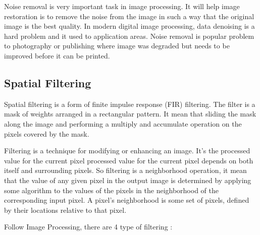 \documentclass[10pt]{article}
\begin{document}
Noise removal is very important task in image processing. It will help image restoration is to remove the noise from the image in such a way that the original image is the best quality. In modern digital image processing, data denoising is a hard problem and it used to application areas. Noise removal is popular problem to  photography or publishing where image was degraded but needs to be improved before it can be printed.


\subsection{Spatial Filtering}
Spatial filtering is a form of finite impulse response (FIR) filtering. The filter is a mask of weights arranged in a rectangular pattern. It mean that sliding the mask along the image and performing a multiply and accumulate operation on the pixels covered by the mask.


Filtering is a technique for modifying or enhancing an image. It's the processed value for the current pixel processed value for the current pixel depends on both itself and surrounding pixels. So filtering is a neighborhood operation, it mean that the value of any given pixel in the output image is determined by applying some algorithm to the values of the pixels in the neighborhood of the corresponding input pixel. A pixel's neighborhood is some set of pixels, defined by their locations relative to that pixel. 

Follow Image Processing,  there are 4 type of filtering :
\end{document}
